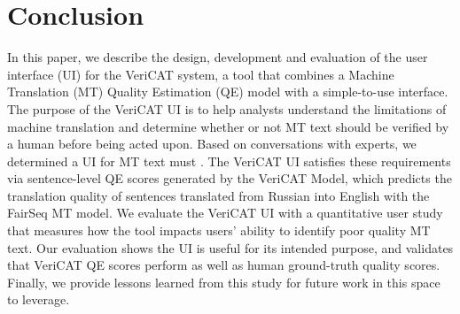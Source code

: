 \section{Conclusion}

In this paper, we describe the design, development and evaluation of the user interface (UI) for the VeriCAT system, a tool that combines a Machine Translation (MT) Quality Estimation (QE) model with a simple-to-use interface. The purpose of the VeriCAT UI is to help analysts understand the limitations of machine translation and determine whether or not MT text should be verified by a human before being acted upon. Based on conversations with experts, we determined a UI for MT text must . The VeriCAT UI satisfies these requirements via sentence-level QE scores generated by the VeriCAT Model, which predicts  the translation quality of sentences translated from Russian into English with the FairSeq MT model. We evaluate the VeriCAT UI with a quantitative user study that measures how the tool impacts users’ ability to identify poor quality MT text. Our evaluation shows the UI is useful for its intended purpose, and validates that VeriCAT QE scores perform as well as human ground-truth quality scores. Finally, we provide lessons learned from this study for future work in this space to leverage.

